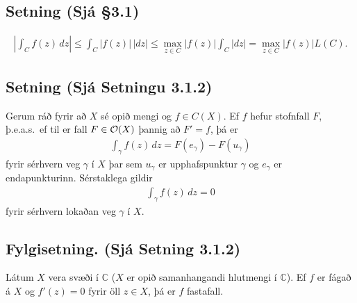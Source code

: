 \documentclass[a4paper,10pt,icelandic]{sphinxmanual}
\begin{document}
\subsection{Setning (Sjá \S{}3.1)}
\label{\detokenize{Kafli03:setning-sja-3-1}}\begin{equation*}
\begin{split}\left|\int_C f(z)\,dz\right|\leq \int_C |f(z)|\, |dz|\leq
\max_{z\in C}|f(z)|\int_C|dz|= \max_{z\in C}|f(z)|L(C).\end{split}
\end{equation*}

\subsection{Setning (Sjá Setningu 3.1.2)}
\label{\detokenize{Kafli03:setning-sja-setningu-3-1-2}}
Gerum ráð fyrir að \(X\) sé opið mengi og \(f\in C(X)\). Ef \(f\) hefur stofnfall \(F\), þ.e.a.s. ef til er fall \(F\in {\cal O}(X)\) þannig að \(F'=f\), þá er
\begin{equation*}
\begin{split}\int_\gamma f(z)\, dz = F(e_\gamma)-F(u_\gamma)\end{split}
\end{equation*}
fyrir sérhvern veg \(\gamma\) í \(X\) þar sem \(u_\gamma\) er upphafspunktur \(\gamma\) og \(e_\gamma\) er endapunkturinn. Sérstaklega gildir
\begin{equation*}
\begin{split}\int_\gamma f(z)\, dz = 0\end{split}
\end{equation*}
fyrir sérhvern lokaðan veg \(\gamma\) í \(X\).


\subsection{Fylgisetning. (Sjá Setning 3.1.2)}
\label{\detokenize{Kafli03:fylgisetning-sja-setning-3-1-2}}
Látum \(X\) vera svæði í \({\mathbb{C}}\) (\(X\) er opið samanhangandi hlutmengi í \({\mathbb{C}}\)). Ef \(f\) er fágað á \(X\) og \(f'(z)=0\) fyrir öll \(z\in X\), þá er \(f\) fastafall.
\end{document}
